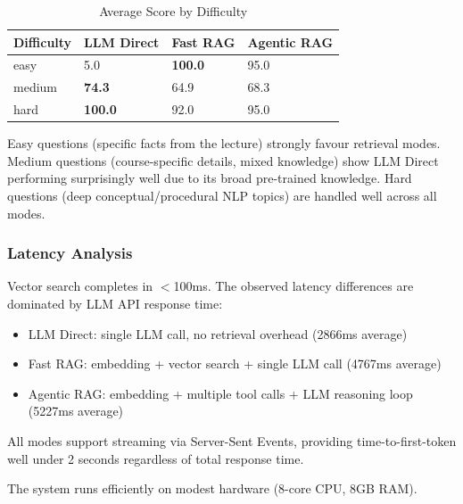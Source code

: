 \begin{table}[H]
    \centering
    \caption{Average Score by Difficulty}
    \begin{tabular}{@{}llll@{}}
        \toprule
        \textbf{Difficulty} & \textbf{LLM Direct} & \textbf{Fast RAG} & \textbf{Agentic RAG} \\ \midrule
        easy   & 5.0  & \textbf{100.0} & 95.0 \\
        medium & \textbf{74.3} & 64.9  & 68.3 \\
        hard   & \textbf{100.0} & 92.0  & 95.0 \\ \bottomrule
    \end{tabular}
\end{table}

Easy questions (specific facts from the lecture) strongly favour retrieval modes. Medium questions (course-specific details, mixed knowledge) show LLM Direct performing surprisingly well due to its broad pre-trained knowledge. Hard questions (deep conceptual/procedural NLP topics) are handled well across all modes.

\subsubsection{Latency Analysis}

Vector search completes in $<$100ms. The observed latency differences are dominated by LLM API response time:

\begin{itemize}
    \item LLM Direct: single LLM call, no retrieval overhead (2866ms average)
    \item Fast RAG: embedding + vector search + single LLM call (4767ms average)
    \item Agentic RAG: embedding + multiple tool calls + LLM reasoning loop (5227ms average)
\end{itemize}

All modes support streaming via Server-Sent Events, providing time-to-first-token well under 2 seconds regardless of total response time.

The system runs efficiently on modest hardware (8-core CPU, 8GB RAM).



